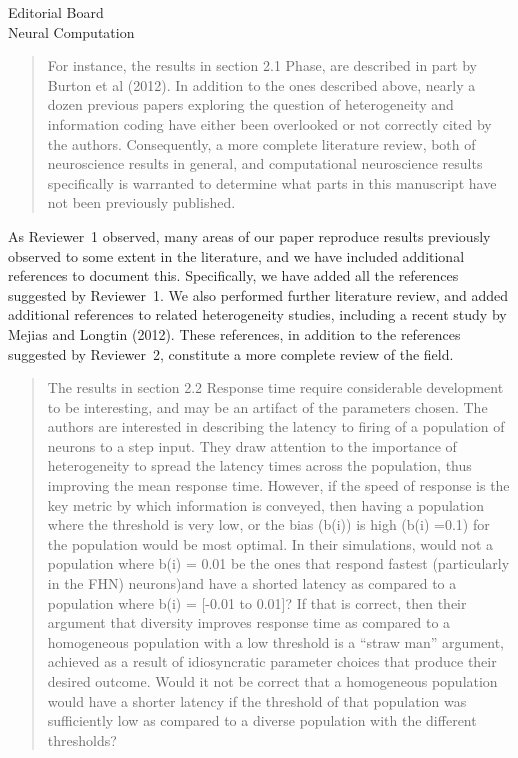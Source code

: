 \documentclass[]{letter}
\begin{document}
\begin{letter}{Editorial Board\\Neural Computation}
\begin{quotation}
  For instance, the results in section 2.1 Phase, are described in part by Burton et al (2012).  In addition to the ones described above, nearly a dozen previous papers exploring the question of heterogeneity and information coding have either been overlooked or not correctly cited by the authors.  Consequently, a more complete literature review, both of neuroscience results in general, and computational neuroscience results specifically is warranted to determine what parts in this manuscript have not been previously published.
\end{quotation}

As Reviewer~1 observed, many areas of our paper reproduce results previously observed to some extent in the literature, and we have included additional references to document this. Specifically, we have added all the references suggested by Reviewer~1. We also performed further literature review, and added additional references to related heterogeneity studies, including a recent study by Mejias and Longtin (2012). These references, in addition to the references suggested by Reviewer~2, constitute a more complete review of the field.

\begin{quotation}
  The results in section 2.2 Response time require considerable development to be interesting, and may be an artifact of the parameters chosen.  The authors are interested in describing the latency to firing of a population of neurons to a step input.  They draw attention to the importance of heterogeneity to spread the latency times across the population, thus improving the mean response time.  However, if the speed of response is the key metric by which information is conveyed, then having a population where the threshold is very low, or the bias (b(i)) is high (b(i) =0.1) for the population would be most optimal.  In their simulations, would not a population where b(i) = 0.01 be the ones that respond fastest (particularly in the  FHN) neurons)and have a shorted latency as compared to a population where b(i) = [-0.01 to 0.01]?  If that is correct, then their argument that diversity improves response time as compared to a homogeneous population with a low threshold is a ``straw man'' argument, achieved as a result of idiosyncratic parameter choices that produce their desired outcome.  Would it not be correct that a homogeneous population would have a shorter latency if the threshold of that population was sufficiently low as compared to a diverse population with the different thresholds?
\end{quotation}


\end{letter}
\end{document}
